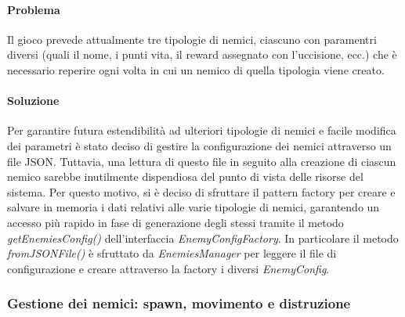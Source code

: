 \documentclass[a4paper,12pt]{report}
\begin{document}
\paragraph{Problema} Il gioco prevede attualmente tre tipologie di nemici, ciascuno con paramentri diversi (quali il nome, i punti vita, il reward assegnato con l'uccisione, ecc.) che è necessario reperire ogni volta in cui un nemico di quella tipologia viene creato. 
\paragraph{Soluzione} Per garantire futura estendibilità ad ulteriori tipologie di nemici e facile modifica dei parametri è stato deciso di gestire la configurazione dei nemici attraverso un file JSON. Tuttavia, una lettura di questo file in seguito alla creazione di ciascun nemico sarebbe inutilmente dispendiosa del punto di vista delle risorse del sistema. Per questo motivo, si è deciso di sfruttare il pattern factory per creare e salvare in memoria i dati relativi alle varie tipologie di nemici, garantendo un accesso più rapido in fase di generazione degli stessi tramite il metodo \textit{getEnemiesConfig()} dell'interfaccia \textit{EnemyConfigFactory}. In particolare il metodo \textit{fromJSONFile()} è sfruttato da \textit{EnemiesManager} per leggere il file di configurazione e creare attraverso la factory i diversi \textit{EnemyConfig}.

\subsubsection{Gestione dei nemici: spawn, movimento e distruzione}
\end{document}
